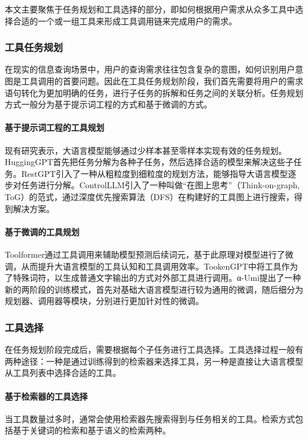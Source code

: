 本文主要聚焦于任务规划和工具选择的部分，即如何根据用户需求从众多工具中选择合适的一个或一组工具来形成工具调用链来完成用户的需求。

\subsubsection{工具任务规划}
在现实的信息查询场景中，用户的查询需求往往包含复杂的意图，如何识别用户意图是工具调用的首要问题。因此在工具任务规划阶段，我们首先需要将用户的需求语句转化为更加明确的任务，进行子任务的拆解和任务之间的关联分析。任务规划方式一般分为基于提示词工程的方式和基于微调的方式。

\paragraph{基于提示词工程的工具规划} 
现有研究\cite{Miao2023}表示，大语言模型能够通过少样本甚至零样本实现有效的任务规划。HuggingGPT\cite{Shen2023}首先把任务分解为各种子任务，然后选择合适的模型来解决这些子任务。RestGPT\cite{Song2023}引入了一种从粗粒度到细粒度的规划方法，能够指导大语言模型逐步对任务进行分解。ControlLLM\cite{Liu2023}引入了一种叫做“在图上思考”（Think-on-graph, ToG）的范式，通过深度优先搜索算法（DFS）在构建好的工具图上进行搜索，得到解决方案。

\paragraph{基于微调的工具规划} 

Toolformer通过工具调用来辅助模型预测后续词元，基于此原理对模型进行了微调，从而提升大语言模型的工具认知和工具调用效率。TookenGPT中将工具作为了特殊词符，以生成普通文字输出的方式对外部工具进行调用。α-Umi提出了一种新的两阶段的训练模式，首先对基础大语言模型进行较为通用的微调，随后细分为规划器、调用器等模块，分别进行更加针对性的微调。

\subsubsection{工具选择}
在任务规划阶段完成后，需要根据每个子任务进行工具选择。工具选择过程一般有两种途径：一种是通过训练得到的检索器来选择工具，另一种是直接让大语言模型从工具列表中选择合适的工具。

\paragraph{基于检索器的工具选择} 
当工具数量过多时，通常会使用检索器先搜索得到与任务相关的工具。检索方式包括基于关键词的检索和基于语义的检索两种。

